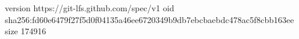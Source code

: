 version https://git-lfs.github.com/spec/v1
oid sha256:fd60e6479f27f5d0f04135a46ee6720349b9db7ebcbaebdc478ac5f8cbb163ee
size 174916
